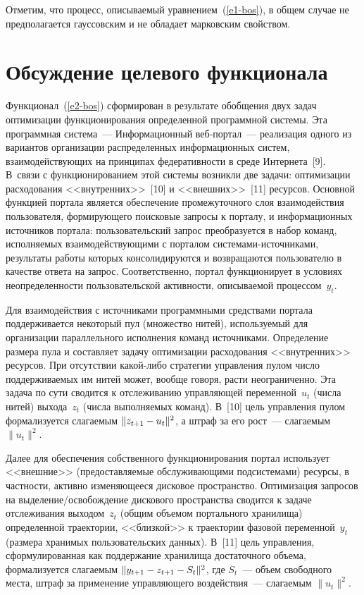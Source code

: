 \begin{multicols}{2}
 Отметим, что процесс, описываемый уравнением~(\ref{e1-bos}), в общем
случае не предполагается гауссовским и не обладает марковским свойством.

\section{Обсуждение целевого функционала}

 Функционал~(\ref{e2-bos}) сформирован в результате обобщения двух
задач оптимизации функционирования определенной программной системы.
Эта программная система~--- Информационный веб-пор\-тал~--- реализация
одного из вариантов организации распределенных информационных систем,
взаимодействующих на принципах федеративности в среде Интернета~[9].
В~связи с функционированием этой системы возникли две задачи:
оптимизации расходования <<внутренних>>~[10] и <<внешних>>~[11]
ресурсов. Основной функцией портала является обеспечение промежуточного
слоя взаимодействия пользователя, формирующего поисковые запросы к
порталу, и информационных источников портала: пользовательский запрос
преобразуется в набор команд, исполняемых взаимодействующими с порталом
сис\-те\-ма\-ми-ис\-точ\-ни\-ка\-ми, результаты работы которых
консолидируются и возвращаются пользователю в качестве ответа на запрос.
Соответственно, портал функционирует в условиях неопределенности
пользовательской активности, описываемой процессом~$y_t$.

 Для взаимодействия с источниками про\-грам\-мны\-ми средствами портала
поддерживается некоторый пул (множество нитей), используемый для
организа\-ции параллельного исполнения команд источниками. Определение
размера пула и со\-став\-ля\-ет задачу оптимизации расходования <<внутренних>>
ресурсов. При отсутствии ка\-кой-ли\-бо стратегии управления пулом число
поддерживаемых им нитей может, вообще говоря, расти неограниченно. Эта
задача по сути сводится к отслеживанию управ\-ля\-ющей переменной~$u_t$
(числа нитей) выхода~$z_t$ (числа выполняемых команд). В~[10] цель
управления пулом формализуется слагаемым $\| z_{t+1}\hm- u_t\|^2$, а штраф
за его рост~--- слагаемым $\| u_t\|^2$.

 Далее для обеспечения собственного функцио\-ни\-рования портал
использует <<внешние>> (предоставляемые обслуживающими подсистемами)
ресур\-сы, в частности, активно изменяющееся дисковое пространство.
Оптимизация запросов на выделение/освобождение дискового пространства
сводится к задаче отслеживания выходом~$z_t$ (общим объемом портального
хранилища) определенной траектории, <<близкой>> к траектории фазовой
переменной~$y_t$ (размера хранимых пользовательских данных). В~[11] цель
управления, сформулированная как поддержание хранилища достаточного
объема, формализуется слагаемым $\| y_{t+1} \hm- z_{t+1} \hm- S_t\|^2$, где
$S_t$~--- объем свободного места, штраф за применение управляющего
воздействия~--- сла\-га\-емым $\| u_t\|^2$.


\end{multicols}

